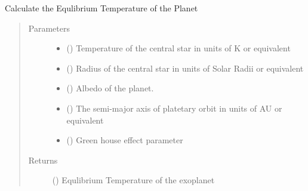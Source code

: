 \documentclass[a4paper,10pt,english]{sphinxmanual}
\begin{document}
\begin{fulllineitems}
\label{\detokenize{cascade.exoplanet_tools:cascade.exoplanet_tools.exoplanet_tools.EquilibriumTemperature}}
Calculate the Equlibrium Temperature of the Planet
\begin{quote}\begin{description}
\item[{Parameters}] \leavevmode\begin{itemize}
\item {} 
 () \textendash{} Temperature of the central star in units of K or equivalent

\item {} 
 () \textendash{} Radius of the central star in units of Solar Radii or equivalent

\item {} 
 () \textendash{} Albedo of the planet.

\item {} 
 () \textendash{} The semi-major axis of platetary orbit in units of AU or equivalent

\item {} 
 () \textendash{} Green house effect parameter

\end{itemize}

\item[{Returns}] \leavevmode
{} () \textendash{} Equlibrium Temperature of the exoplanet

\end{description}\end{quote}

\end{fulllineitems}
\end{document}
